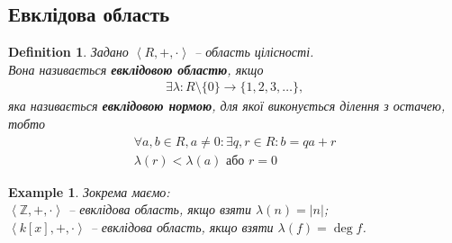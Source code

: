 \documentclass[a4paper, 10pt]{article}
\theoremstyle{theoremdd}
\theoremstyle{theoremdd}
\newtheorem{definition}[theorem]{Definition}
\theoremstyle{theoremdd}
\theoremstyle{theoremdd}
\theoremstyle{theoremdd}
\newtheorem{example}[theorem]{Example}
\theoremstyle{theoremdd}
\theoremstyle{theoremdd}
\theoremstyle{theoremdd}
\theoremstyle{theoremdd}
\theoremstyle{theoremdd}
\theoremstyle{theoremdd}
\theoremstyle{theoremdd}
\theoremstyle{theoremdd}
\theoremstyle{theoremdd}
\theoremstyle{theoremdd}
\begin{document}
\subsection{Евклідова область}
\begin{definition}
Задано $\left< R, +, \cdot \right>$ -- область цілісності.\\
Вона називається \textbf{евклідовою областю}, якщо
\begin{align*}
\exists \lambda \colon R \setminus \{0\} \to \{1,2,3,\dots\},
\end{align*}
яка називається \textbf{евклідовою нормою}, для якої виконується ділення з остачею, тобто
\begin{align*}
\forall a,b \in R, a \neq 0: \exists q,r \in R: b = qa+r \\
\lambda(r) < \lambda(a) \text{ або } r = 0
\end{align*}
\end{definition}

\begin{example}
Зокрема маємо:\\
$\left< \mathbb{Z},+,\cdot \right>$ -- евклідова область, якщо взяти $\lambda(n) = |n|$;\\
$\left< k[x], +, \cdot \right>$ -- евклідова область, якщо взяти $\lambda(f) = \deg f$.
\end{example}
\end{document}
